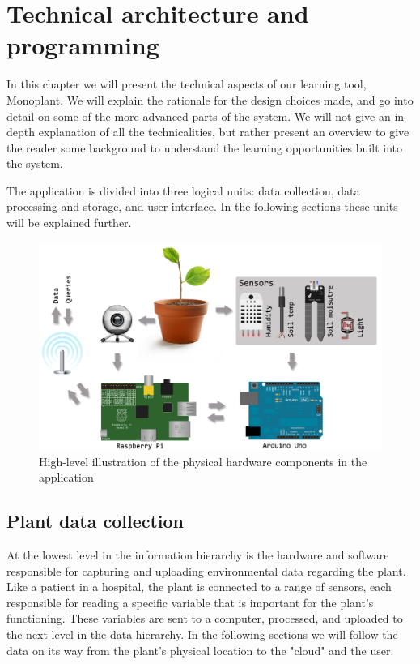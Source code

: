 \chapter{Technical architecture and programming}
In this chapter we will present the technical aspects of our learning tool, Monoplant. We will explain the rationale for the design choices made, and go into detail on some of the more advanced parts of the system. We will not give an in-depth explanation of all the technicalities, but rather present an overview to give the reader some background to understand the learning opportunities built into the system. 

The application is divided into three logical units: data collection, data processing and storage, and user interface. In the following sections these units will be explained further. 

\begin{figure}
\centering
\includegraphics[width=1\textwidth]{img/hardware/application.png}
\caption{High-level illustration of the physical hardware components in the application}
\label{fig:application}
\end{figure}

\section{Plant data collection}
At the lowest level in the information hierarchy is the hardware and software responsible for capturing and uploading environmental data regarding the plant. Like a patient in a hospital, the plant is connected to a range of sensors, each responsible for reading a specific variable that is important for the plant's functioning. These variables are sent to a computer, processed, and uploaded to the next level in the data hierarchy. In the following sections we will follow the data on its way from the plant's physical location to the "cloud" and the user.

